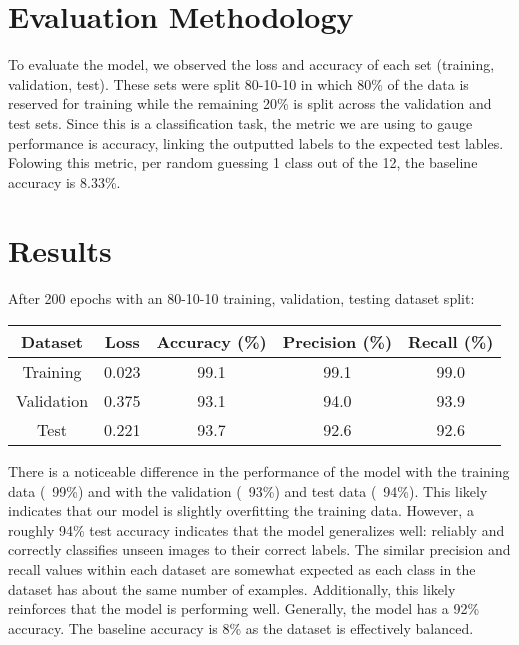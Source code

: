 \documentclass[10pt]{article}
\begin{document}
\section{Evaluation Methodology}

\indent To evaluate the model, we observed the loss and accuracy of each set (training, validation, test). These sets were split 80-10-10 in which 80\% of the data is reserved for training while the remaining 20\% is split across the validation and test sets. Since this is a classification task, the metric we are using to gauge performance is accuracy, linking the outputted labels to the expected test lables. Folowing this metric, per random guessing 1 class out of the 12, the baseline accuracy is 8.33\%.




\section{Results}

\indent After 200 epochs with an 80-10-10 training, validation, testing dataset split:
 
\begin{center}
\begin{tabular}{|c c c c c|} 
 \hline
 Dataset & Loss & Accuracy (\%) & Precision (\%) & Recall (\%) \\ 
 \hline
 Training & 0.023 & 99.1 & 99.1 & 99.0 \\ 
 \hline
 Validation & 0.375 & 93.1 & 94.0 & 93.9 \\ 
 \hline
 Test & 0.221 & 93.7 & 92.6 & 92.6 \\ 
\hline
\end{tabular}
\end{center}

\indent There is a noticeable difference in the performance of the model with the training data (~99\%) and with the validation (~93\%) and test data (~94\%). This likely indicates that our model is slightly overfitting the training data. However, a roughly 94\% test accuracy indicates that the model generalizes well: reliably and correctly classifies unseen images to their correct labels. The similar precision and recall values within each dataset are somewhat expected as each class in the dataset has about the same number of examples. Additionally, this likely reinforces that the model is performing well. Generally, the model has a 92\% accuracy. The baseline accuracy is 8\% as the dataset is effectively balanced.
\end{document}
